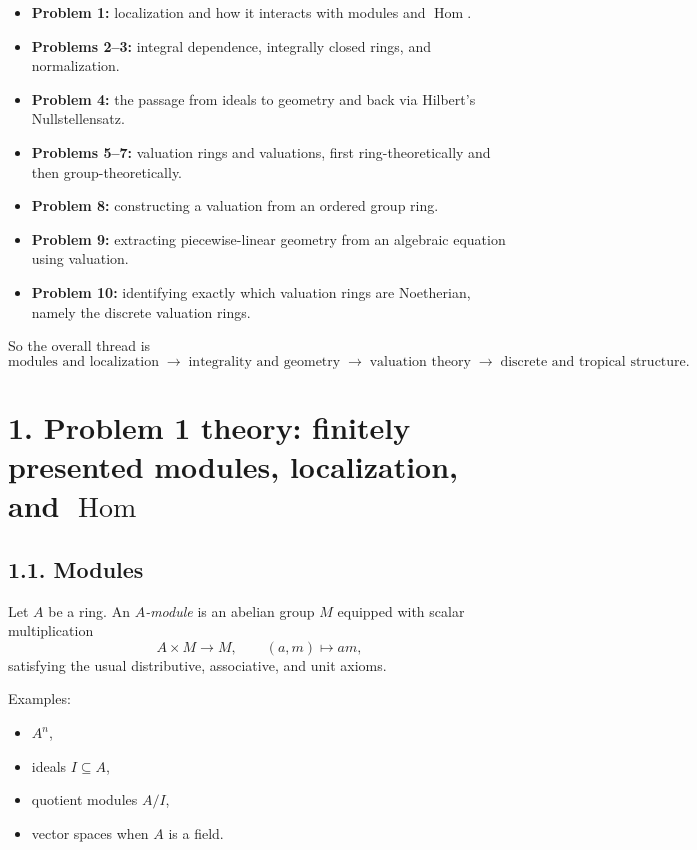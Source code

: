 \documentclass[12pt,a4paper]{article}
\theoremstyle{plain}
\theoremstyle{definition}      %
\begin{document}
\begin{itemize}
	\item \textbf{Problem 1:} localization and how it interacts with modules and \(\operatorname{Hom}\).
	\item \textbf{Problems 2--3:} integral dependence, integrally closed rings, and normalization.
	\item \textbf{Problem 4:} the passage from ideals to geometry and back via Hilbert's Nullstellensatz.
	\item \textbf{Problems 5--7:} valuation rings and valuations, first ring-theoretically and then group-theoretically.
	\item \textbf{Problem 8:} constructing a valuation from an ordered group ring.
	\item \textbf{Problem 9:} extracting piecewise-linear geometry from an algebraic equation using valuation.
	\item \textbf{Problem 10:} identifying exactly which valuation rings are Noetherian, namely the discrete valuation rings.
\end{itemize}

So the overall thread is
\[
\text{modules and localization}
\;\longrightarrow\;
\text{integrality and geometry}
\;\longrightarrow\;
\text{valuation theory}
\;\longrightarrow\;
\text{discrete and tropical structure}.
\]

\bigskip

\section*{1. Problem 1 theory: finitely presented modules, localization, and \texorpdfstring{$\operatorname{Hom}$}{Hom}}

\subsection*{1.1. Modules}

Let \(A\) be a ring. An \emph{\(A\)-module} is an abelian group \(M\) equipped with scalar multiplication
\[
A\times M \to M,\qquad (a,m)\mapsto am,
\]
satisfying the usual distributive, associative, and unit axioms.

Examples:
\begin{itemize}
	\item \(A^n\),
	\item ideals \(I\subseteq A\),
	\item quotient modules \(A/I\),
	\item vector spaces when \(A\) is a field.
\end{itemize}
\end{document}
